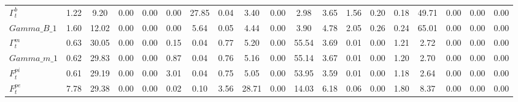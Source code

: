 \begin{center}
\begin{longtable}{lcccccccccccccccccc}
$ \Gamma^b_t        $	 & 	             1.22	 & 	             9.20	 & 	             0.00	 & 	             0.00	 & 	             0.00	 & 	            27.85	 & 	             0.04	 & 	             3.40	 & 	             0.00	 & 	             2.98	 & 	             3.65	 & 	             1.56	 & 	             0.20	 & 	             0.18	 & 	            49.71	 & 	             0.00	 & 	             0.00	 & 	             0.00 \\ 
$Gamma\_B\_1        $	 & 	             1.60	 & 	            12.02	 & 	             0.00	 & 	             0.00	 & 	             0.00	 & 	             5.64	 & 	             0.05	 & 	             4.44	 & 	             0.00	 & 	             3.90	 & 	             4.78	 & 	             2.05	 & 	             0.26	 & 	             0.24	 & 	            65.01	 & 	             0.00	 & 	             0.00	 & 	             0.00 \\ 
$ \Gamma^m_t        $	 & 	             0.63	 & 	            30.05	 & 	             0.00	 & 	             0.00	 & 	             0.15	 & 	             0.04	 & 	             0.77	 & 	             5.20	 & 	             0.00	 & 	            55.54	 & 	             3.69	 & 	             0.01	 & 	             0.00	 & 	             1.21	 & 	             2.72	 & 	             0.00	 & 	             0.00	 & 	             0.00 \\ 
$Gamma\_m\_1        $	 & 	             0.62	 & 	            29.83	 & 	             0.00	 & 	             0.00	 & 	             0.87	 & 	             0.04	 & 	             0.76	 & 	             5.16	 & 	             0.00	 & 	            55.14	 & 	             3.67	 & 	             0.01	 & 	             0.00	 & 	             1.20	 & 	             2.70	 & 	             0.00	 & 	             0.00	 & 	             0.00 \\ 
$ F^{pi}_t          $	 & 	             0.61	 & 	            29.19	 & 	             0.00	 & 	             0.00	 & 	             3.01	 & 	             0.04	 & 	             0.75	 & 	             5.05	 & 	             0.00	 & 	            53.95	 & 	             3.59	 & 	             0.01	 & 	             0.00	 & 	             1.18	 & 	             2.64	 & 	             0.00	 & 	             0.00	 & 	             0.00 \\ 
$ F^{pe}_t          $	 & 	             7.78	 & 	            29.38	 & 	             0.00	 & 	             0.00	 & 	             0.02	 & 	             0.10	 & 	             3.56	 & 	            28.71	 & 	             0.00	 & 	            14.03	 & 	             6.18	 & 	             0.06	 & 	             0.00	 & 	             1.80	 & 	             8.37	 & 	             0.00	 & 	             0.00	 & 	             0.00 \\ 

\end{longtable}
\end{center}
